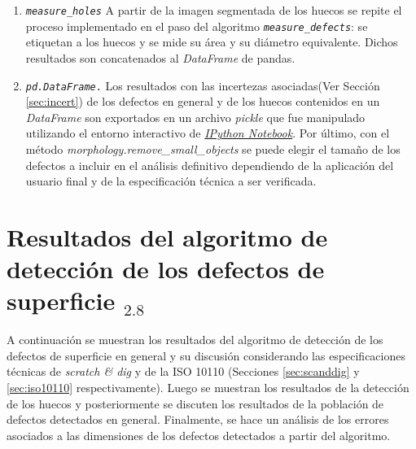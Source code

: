 \begin{enumerate}
\item \texttt{\textit{measure\_holes}} A partir de la imagen segmentada de los huecos se repite el proceso implementado en el paso del algoritmo \texttt{\textit{measure\_defects}}: se etiquetan a los huecos y se mide su área y su diámetro equivalente. Dichos resultados son concatenados al \textit{DataFrame} de pandas.
\item \texttt{\textit{pd.DataFrame}.} Los resultados con las incertezas asociadas(Ver Sección \ref{sec:incert}) de los defectos en general y de los huecos contenidos en un \textit{DataFrame} son exportados en un archivo \textit{pickle} que fue manipulado utilizando el entorno interactivo de \href{https://ipython.org/notebook.html}{\textit{IPython Notebook}}. Por último, con el método \textit{morphology.remove\_small\_objects} se puede elegir el tamaño de los defectos a incluir en el análisis definitivo dependiendo de la aplicación del usuario final y de la especificación técnica a ser verificada.
\end{enumerate}



\singlespacing
\section{Resultados del algoritmo de detección de los defectos de superficie \href{https://github.com/jrr1984/defects_analysis/blob/master/Defects\%20analysis.ipynb}{\faGithub$_{2.8}$}}
\label{sec:resgrl}


\hspace{0.5cm}A continuación se muestran los resultados del algoritmo de detección de los defectos de superficie en general y su discusión considerando las especificaciones técnicas de \textit{scratch \& dig} y de la ISO 10110 (Secciones \ref{sec:scanddig} y \ref{sec:iso10110} respectivamente). Luego se muestran los resultados de la detección de los huecos y posteriormente se discuten los resultados de la población de defectos detectados en general. Finalmente, se hace un análisis de los errores asociados a las dimensiones de los defectos detectados a partir del algoritmo.


